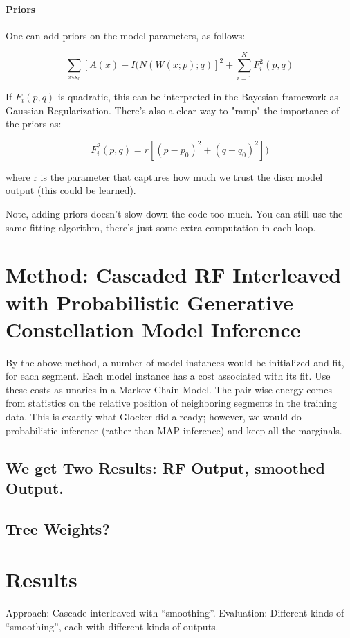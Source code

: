 \documentclass[10pt,twocolumn,letterpaper]{article}
\begin{document}
\paragraph{Priors}

One can add priors on the model parameters, as follows:

\[ \sum_{x \epsilon s_0} [A(x) - I(N(W(x;p);q)]^2 + \sum_{i=1}^K F_i^2(p,q) \]

If $F_i(p,q)$ is quadratic, this can be interpreted in the Bayesian framework as Gaussian Regularization.  There's also a clear way to "ramp" the importance of the priors as:

\[ F_i^2(p,q) = r[(p-p_0)^2+(q-q_0)^2]) \]

where r is the parameter that captures how much we trust the discr model output (this could be learned).

Note, adding priors doesn't slow down the code too much.  You can still use the same fitting algorithm, there's just some extra computation in each loop.


\section{Method: Cascaded RF Interleaved with Probabilistic Generative Constellation Model Inference}

By the above method, a number of model instances would be initialized and fit, for each segment.  Each model instance has a cost associated with its fit.  Use these costs as unaries in a Markov Chain Model.  The pair-wise energy comes from statistics on the relative position of neighboring segments in the training data.  This is exactly what Glocker did already; however, we would do probabilistic inference (rather than MAP inference) and keep all the marginals.

\subsection{We get Two Results: RF Output, smoothed Output.}

\subsection{Tree Weights?}

\section{Results}
Approach: Cascade interleaved with "`smoothing"'. 
Evaluation: Different kinds of "`smoothing"', each with different kinds of outputs.
\end{document}
